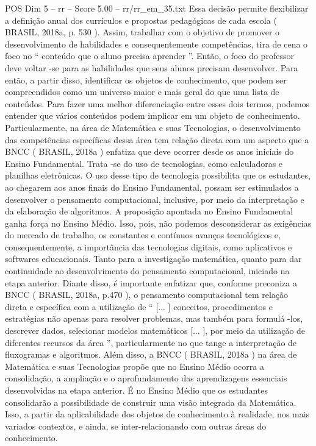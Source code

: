 \begin{textsample}{POS Dim 5 – rr – Score 5.00 – rr/rr\_em\_35.txt}
Essa decisão permite flexibilizar a definição anual dos currículos e propostas pedagógicas de cada escola ( BRASIL, 2018a, p. 530 ).
Assim, trabalhar com o objetivo de promover o desenvolvimento de habilidades e consequentemente competências, tira de cena o foco no “ conteúdo que o aluno precisa aprender ”.
Então, o foco do professor deve voltar -se para as habilidades que seus alunos precisam desenvolver.
Para então, a partir disso, identificar os objetos de conhecimento, que podem ser compreendidos como um universo maior e mais geral do que uma lista de conteúdos.
Para fazer uma melhor diferenciação entre esses dois termos, podemos entender que vários conteúdos podem implicar em um objeto de conhecimento.
Particularmente, na área de Matemática e suas Tecnologias, o desenvolvimento das competências específicas dessa área tem relação direta com um aspecto que a BNCC ( BRASIL, 2018a ) enfatiza que deve ocorrer desde os anos iniciais do Ensino Fundamental.
Trata -se do uso de tecnologias, como calculadoras e planilhas eletrônicas.
O uso desse tipo de tecnologia possibilita que os estudantes, ao chegarem aos anos finais do Ensino Fundamental, possam ser estimulados a desenvolver o pensamento computacional, inclusive, por meio da interpretação e da elaboração de algoritmos.
A proposição apontada no Ensino Fundamental ganha força no Ensino Médio.
Isso, pois, não podemos desconsiderar as exigências do mercado de trabalho, os constantes e contínuos avanços tecnológicos e, consequentemente, a importância das tecnologias digitais, como aplicativos e softwares educacionais.
Tanto para a investigação matemática, quanto para dar continuidade ao desenvolvimento do pensamento computacional, iniciado na etapa anterior.
Diante disso, é importante enfatizar que, conforme preconiza a BNCC ( BRASIL, 2018a, p.470 ), o pensamento computacional tem relação direta e específica com a utilização de “ [... ] conceitos, procedimentos e estratégias não apenas para resolver problemas, mas também para formulá -los, descrever dados, selecionar modelos matemáticos [... ], por meio da utilização de diferentes recursos da área ”, particularmente no que tange a interpretação de fluxogramas e algoritmos.
Além disso, a BNCC ( BRASIL, 2018a ) na área de Matemática e suas Tecnologias propõe que no Ensino Médio ocorra a consolidação, a ampliação e o aprofundamento das aprendizagens essenciais desenvolvidas na etapa anterior.
É no Ensino Médio que os estudantes consolidarão a possibilidade de construir uma visão integrada da Matemática.
Isso, a partir da aplicabilidade dos objetos de conhecimento à realidade, nos mais variados contextos, e ainda, se inter-relacionando com outras áreas do conhecimento.

\end{textsample}
